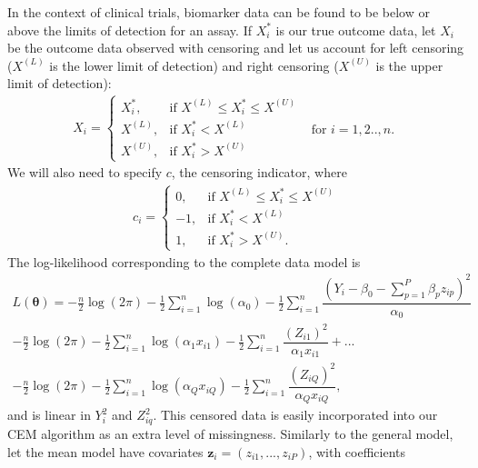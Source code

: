 \documentclass[
]{jss}
\begin{document}
In the context of clinical trials, biomarker data can be found to be
below or above the limits of detection for an assay. If \(X_i^*\) is our
true outcome data, let \(X_i\) be the outcome data observed with
censoring and let us account for left censoring (\(X^{(L)}\) is the
lower limit of detection) and right censoring (\(X^{(U)}\) is the upper
limit of detection):\\
\begin{align}
X_i = 
  \begin{cases}
X_i^*,          & \text{if } X^{(L)} \leq X_i^* \leq X^{(U)}\\
X^{(L)},        & \text{if } X_i^* < X^{(L)} ~~~~~~~~~~~~~~~~~~~~~~~\textrm{for  } i = 1,2 .., n.\\
X^{(U)},        & \text{if } X_i^* > X^{(U)}
\end{cases} \label{xi}
\end{align} We will also need to specify \(c\), the censoring indicator,
where \begin{align*}
c_i = 
  \begin{cases}
0,          & \text{if } X^{(L)} \leq X_i^* \leq X^{(U)}\\
-1,        & \text{if } X_i^* < X^{(L)}\\
1,      & \text{if } X_i^* > X^{(U)}.
\end{cases}
\end{align*} The log-likelihood corresponding to the complete data model
is \begin{align}
L \left( \bm{\theta} \right) = 
  -\frac{n}{2}  \log(2\pi)-\frac{1}{2} \sum\limits_{i=1}^n \log \left( \alpha_0 \right) -\frac{1}{2} \sum\limits_{i=1}^n \dfrac{\left( Y_i-\beta_0- \sum\limits_{p=1}^P \beta_p z_{ip}\right) ^2}{\alpha_0} \nonumber \\[6pt]
-\frac{n}{2}  \log(2\pi)-\frac{1}{2} \sum\limits_{i=1}^n \log \left(\alpha_1 x_{i1} \right) -\frac{1}{2} \sum\limits_{i=1}^n \dfrac{\left( Z_{i1} \right) ^2}{\alpha_1 x_{i1}}
+... \nonumber \\[6pt]
-\frac{n}{2}  \log(2\pi)-\frac{1}{2} \sum\limits_{i=1}^n \log \left(\alpha_Q x_{iQ} \right) -\frac{1}{2} \sum\limits_{i=1}^n \dfrac{\left( Z_{iQ} \right) ^2}{\alpha_Q x_{iQ}},  \label{completedatall}
\end{align} and is linear in \(Y_i^2\) and \(Z_{iq}^2\). This censored
data is easily incorporated into our CEM algorithm as an extra level of
missingness. Similarly to the general model, let the mean model have
covariates \(\bm{z}_{i}=(z_{i1}, ..., z_{iP})\), with coefficients
\end{document}
